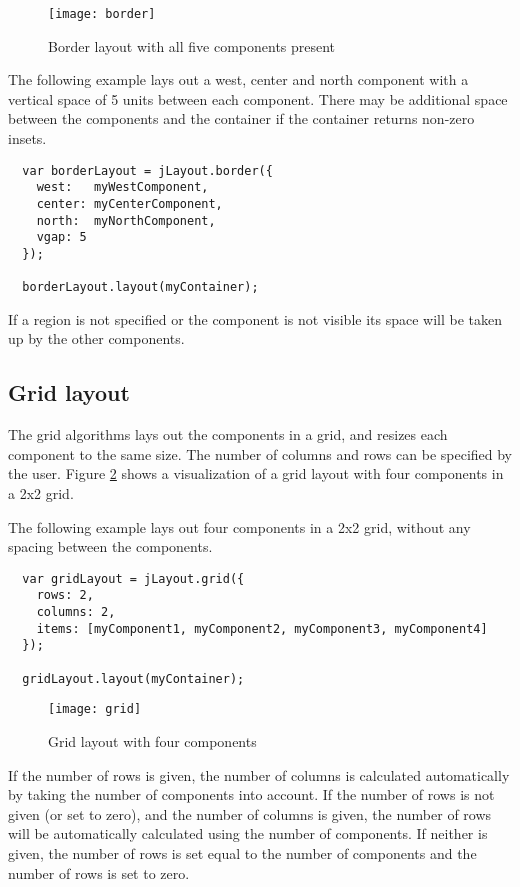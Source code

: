\begin{figure}[h!]
\centering
\texttt{[image: border]}
\caption{Border layout with all five components present}
\label{border}
\end{figure}

The following example lays out a west, center and north component with a vertical space of 5 units between each component. There may be additional space between the components and the container if the container returns non-zero insets.
\begin{verbatim}
  var borderLayout = jLayout.border({
    west:   myWestComponent,
    center: myCenterComponent,
    north:  myNorthComponent,
    vgap: 5
  });

  borderLayout.layout(myContainer);
\end{verbatim}
If a region is not specified or the component is not visible its space will be taken up by the other components. 

\subsection{Grid layout}
The grid algorithms lays out the components in a grid, and resizes each component to the same size. The number of columns and rows can be specified by the user. Figure \ref{grid} shows a visualization of a grid layout with four components in a 2x2 grid. 

The following example lays out four components in a 2x2 grid, without any spacing between the components.
\begin{verbatim}
  var gridLayout = jLayout.grid({
    rows: 2,
    columns: 2,
    items: [myComponent1, myComponent2, myComponent3, myComponent4]
  });

  gridLayout.layout(myContainer);
\end{verbatim}

\begin{figure}[h]
\centering
\texttt{[image: grid]}
\caption{Grid layout with four components}
\label{grid}
\end{figure}

If the number of rows is given, the number of columns is calculated automatically by taking the number of components into account. If the number of rows is not given (or set to zero), and the number of columns is given, the number of rows will be automatically calculated using the number of components. If neither is given, the number of rows is set equal to the number of components and the number of rows is set to zero.

